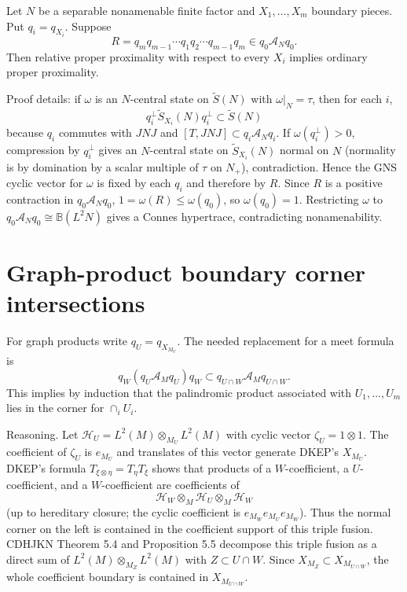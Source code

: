 \documentclass{article}
\begin{document}
Let $N$ be a separable nonamenable finite factor and $X_1,\dots,X_m$ boundary
pieces.  Put $q_i=q_{X_i}$.  Suppose
\[
  R=q_mq_{m-1}\cdots q_1q_2\cdots q_{m-1}q_m\in q_0\mathcal A_Nq_0.
\]
Then relative proper proximality with respect to every $X_i$ implies ordinary
proper proximality.

Proof details:
if $\omega$ is an $N$-central state on $\widetilde S(N)$ with $\omega|_N=\tau$,
then for each $i$,
\[
  q_i^\perp\widetilde S_{X_i}(N)q_i^\perp\subset \widetilde S(N)
\]
because $q_i$ commutes with $JNJ$ and $[T,JNJ]\subset q_i\mathcal A_Nq_i$.
If $\omega(q_i^\perp)>0$, compression by $q_i^\perp$ gives an $N$-central state
on $\widetilde S_{X_i}(N)$ normal on $N$ (normality is by domination by a scalar
multiple of $\tau$ on $N_+$), contradiction.  Hence the GNS cyclic vector for
$\omega$ is fixed by each $q_i$ and therefore by $R$.  Since $R$ is a positive
contraction in $q_0\mathcal A_Nq_0$, $1=\omega(R)\le \omega(q_0)$, so
$\omega(q_0)=1$.  Restricting $\omega$ to $q_0\mathcal A_Nq_0\cong
\mathbb B(L^2N)$ gives a Connes hypertrace, contradicting nonamenability.

\section*{Graph-product boundary corner intersections}

For graph products write $q_U=q_{X_{M_U}}$.  The needed replacement for a meet
formula is
\[
  q_W(q_U\mathcal A_Mq_U)q_W\subset q_{U\cap W}\mathcal A_Mq_{U\cap W}.
\]
This implies by induction that the palindromic product associated with
$U_1,\dots,U_m$ lies in the corner for $\cap_iU_i$.

Reasoning.  Let $\mathcal H_U=L^2(M)\otimes_{M_U}L^2(M)$ with cyclic vector
$\zeta_U=1\otimes 1$.  The coefficient of $\zeta_U$ is $e_{M_U}$ and translates
of this vector generate DKEP's $X_{M_U}$.  DKEP's formula
$T_{\xi\otimes\eta}=T_\eta T_\xi$ shows that products of a $W$-coefficient, a
$U$-coefficient, and a $W$-coefficient are coefficients of
\[
  \mathcal H_W\otimes_M \mathcal H_U\otimes_M \mathcal H_W
\]
(up to hereditary closure; the cyclic coefficient is
$e_{M_W}e_{M_U}e_{M_W}$).  Thus the normal corner on the left is contained in
the coefficient support of this triple fusion.  CDHJKN Theorem 5.4 and
Proposition 5.5 decompose this triple fusion as a direct sum of
$L^2(M)\otimes_{M_Z}L^2(M)$ with $Z\subset U\cap W$.  Since $X_{M_Z}\subset
X_{M_{U\cap W}}$, the whole coefficient boundary is contained in
$X_{M_{U\cap W}}$.
\end{document}
